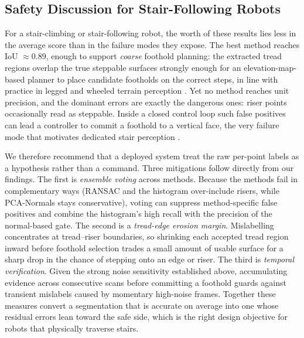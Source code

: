 \subsection{Safety Discussion for Stair-Following Robots}

For a stair-climbing or stair-following robot, the worth of these results
lies less in the average score than in the failure modes they expose. The
best method reaches IoU $\approx 0.89$, enough to support \emph{coarse}
foothold planning: the extracted tread regions overlap the true steppable
surfaces strongly enough for an elevation-map-based planner to place
candidate footholds on the correct steps, in line with practice in legged
and wheeled terrain perception
\cite{chavezgarcia2017learning,gomes2023survey}. Yet no method reaches unit
precision, and the dominant errors are exactly the dangerous ones: riser
points occasionally read as steppable. Inside a closed control loop such
false positives can lead a controller to commit a foothold to a vertical
face, the very failure mode that motivates dedicated stair perception
\cite{matsumura2022deep}.

We therefore recommend that a deployed system treat the raw per-point
labels as a hypothesis rather than a command. Three mitigations follow
directly from our findings. The first is \emph{ensemble voting} across
methods. Because the methods fail in complementary ways (RANSAC and the
histogram over-include risers, while PCA-Normals stays conservative),
voting can suppress method-specific false positives and combine the
histogram's high recall with the precision of the normal-based gate.
The second is a \emph{tread-edge erosion margin}. Mislabelling concentrates
at tread--riser boundaries, so shrinking each accepted tread region inward
before foothold selection trades a small amount of usable surface for a
sharp drop in the chance of stepping onto an edge or riser.
The third is \emph{temporal verification}. Given the strong noise
sensitivity established above, accumulating evidence across consecutive
scans before committing a foothold guards against transient mislabels
caused by momentary high-noise frames. Together these measures convert a
segmentation that is accurate on average into one whose residual errors
lean toward the safe side, which is the right design objective for robots
that physically traverse stairs.
